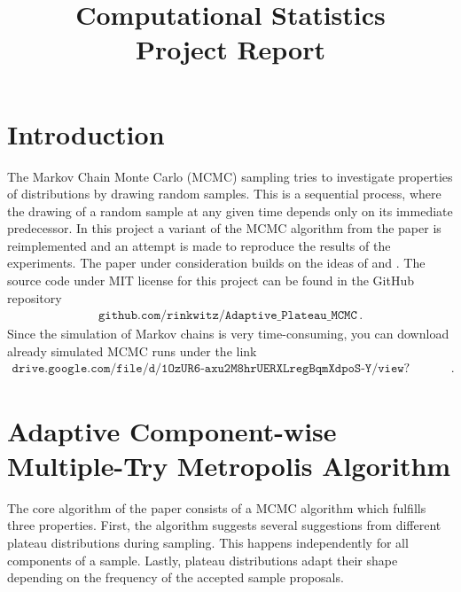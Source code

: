 \documentclass{scrartcl}
\title{Computational Statistics\\Project Report}
\begin{document}

    \maketitle

    \section{Introduction}
    The Markov Chain Monte Carlo (MCMC) sampling tries to investigate properties of distributions by drawing
    random samples. This is a sequential process, where the drawing of a random sample at any given
    time depends only on its immediate predecessor. In this project a variant of the MCMC algorithm from the paper
    \cite{lau2019} is reimplemented and an attempt is made to reproduce the results of the experiments. The paper under consideration builds on the ideas of
    \cite{metropolis1953,geyer1992,liu2000} and \cite{yang2019}.
    The source code under MIT license for this project can be found in the GitHub repository
    \begin{align*}
        \texttt{github.com/rinkwitz/Adaptive\_Plateau\_MCMC}\,.
    \end{align*}
    Since the simulation of Markov chains is very time-consuming, you can download already simulated MCMC runs under the link
    \begin{align*}
        \texttt{drive.google.com/file/d/1OzUR6-axu2M8hrUERXLregBqmXdpoS-Y/view?usp=sharing}\,.
    \end{align*}

    \section{Adaptive Component-wise Multiple-Try Metropolis Algorithm} The core algorithm
    of the paper \cite{lau2019} consists of a MCMC algorithm which fulfills three properties. First, the algorithm suggests
    several suggestions from different plateau distributions during sampling. This happens independently for all
    components of a sample. Lastly, plateau distributions adapt their shape depending on the frequency of the accepted sample proposals.
\end{document}
